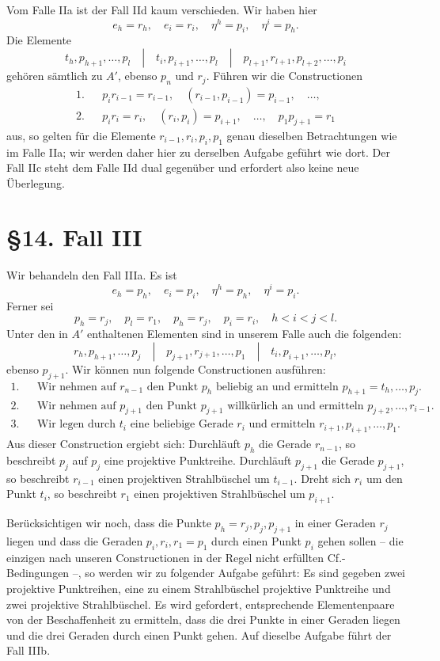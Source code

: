 \documentclass[11pt]{article}
\newcommand{\Cf}{\textup{Cf.}}
\begin{document}
Vom Falle IIa ist der Fall IId kaum verschieden. Wir haben hier
\[
e_h=r_h,
\quad e_i=r_i,
\quad \eta^h=p_i,
\quad \eta^i=p_h.
\]
Die Elemente
\[
t_h,p_{h+1},\ldots,p_l
\quad |\quad
 t_i,p_{i+1},\ldots,p_l
\quad |\quad
p_{l+1},r_{l+1},p_{l+2},\ldots,p_i
\]
gehören sämtlich zu $A'$, ebenso $p_n$ und $r_j$. Führen wir die Constructionen
\[
\begin{array}{rcl}
1.&&p_i r_{i-1}=r_{i-1},
\quad (r_{i-1},p_{i-1})=p_{i-1},
\quad \ldots,\\
2.&&p_i r_i=r_i,
\quad (r_i,p_i)=p_{i+1},
\quad \ldots,
\quad p_1p_{j+1}=r_1
\end{array}
\]
aus, so gelten für die Elemente $r_{i-1},r_i,p_i,p_1$ genau dieselben Betrachtungen wie im Falle IIa; wir werden daher hier zu derselben Aufgabe geführt wie dort. Der Fall IIc steht dem Falle IId dual gegenüber und erfordert also keine neue Überlegung.

\section*{\S 14. Fall III}
Wir behandeln den Fall IIIa. Es ist
\[
e_h=p_h,
\quad e_i=p_i,
\quad \eta^h=p_h,
\quad \eta^i=p_i.
\]
Ferner sei
\[
p_h=r_j,
\quad p_l=r_1,
\quad p_h=r_j,
\quad p_i=r_i,
\quad h<i<j<l.
\]
Unter den in $A'$ enthaltenen Elementen sind in unserem Falle auch die folgenden:
\[
r_h,p_{h+1},\ldots,p_j
\quad |\quad
p_{j+1},r_{j+1},\ldots,p_1
\quad |\quad
t_i,p_{i+1},\ldots,p_l,
\]
ebenso $p_{j+1}$. Wir können nun folgende Constructionen ausführen:
\[
\begin{array}{rcl}
1.&&\text{Wir nehmen auf } r_{n-1}\text{ den Punkt }p_h\text{ beliebig an und ermitteln }p_{h+1}=t_h,\ldots,p_j.\\
2.&&\text{Wir nehmen auf }p_{j+1}\text{ den Punkt }p_{j+1}\text{ willkürlich an und ermitteln }p_{j+2},\ldots,r_{i-1}.\\
3.&&\text{Wir legen durch }t_i\text{ eine beliebige Gerade }r_i\text{ und ermitteln }r_{i+1},p_{i+1},\ldots,p_1.
\end{array}
\]
Aus dieser Construction ergiebt sich: Durchläuft $p_h$ die Gerade $r_{n-1}$, so beschreibt $p_j$ auf $p_j$ eine projektive Punktreihe. Durchläuft $p_{j+1}$ die Gerade $p_{j+1}$, so beschreibt $r_{i-1}$ einen projektiven Strahlbüschel um $t_{i-1}$. Dreht sich $r_i$ um den Punkt $t_i$, so beschreibt $r_1$ einen projektiven Strahlbüschel um $p_{i+1}$.

Berücksichtigen wir noch, dass die Punkte $p_h=r_j,p_j,p_{j+1}$ in einer Geraden $r_j$ liegen und dass die Geraden $p_i,r_i,r_1=p_1$ durch einen Punkt $p_i$ gehen sollen -- die einzigen nach unseren Constructionen in der Regel nicht erfüllten \Cf-Bedingungen --, so werden wir zu folgender Aufgabe geführt: Es sind gegeben zwei projektive Punktreihen, eine zu einem Strahlbüschel projektive Punktreihe und zwei projektive Strahlbüschel. Es wird gefordert, entsprechende Elementenpaare von der Beschaffenheit zu ermitteln, dass die drei Punkte in einer Geraden liegen und die drei Geraden durch einen Punkt gehen. Auf dieselbe Aufgabe führt der Fall IIIb.
\end{document}
